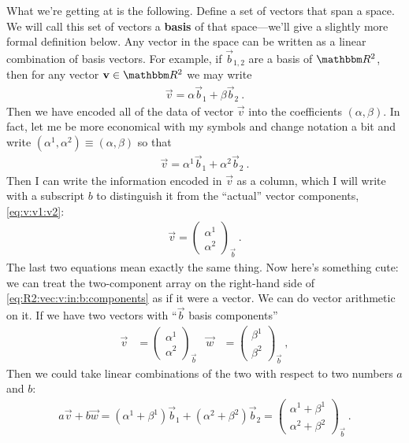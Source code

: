 \documentclass[12pt, oneside]{report}    %
\begin{document}
What we're getting at is the following.  Define a set of vectors that span a space. We will call this set of vectors a \textbf{basis} of that space---we'll give a slightly more formal definition below. Any vector in the space can be written as a linear combination of basis vectors. For example, if $\vec{b}_{1,2}$ are a basis of $\RR ^2$, then for any vector $\vec{v}\in\RR ^2$ we may write
\begin{align}
    \vec{v} = \alpha \vec{b}_{1} + \beta \vec{b}_2 \ .
\end{align}
Then we have encoded all of the data of vector $\vec{v}$ into the coefficients $(\alpha, \beta)$. In fact, let me be more economical with my symbols and change notation a bit and write $(\alpha^1, \alpha^2) \equiv (\alpha,\beta)$ so that
\begin{align}
    \vec{v} = \alpha^1 \vec{b}_{1} + \alpha^2 \vec{b}_2 \ .
    \label{eq:R2:vec:v:in:b:components:lincomb}
\end{align}
Then I can write the information encoded in $\vec{v}$ as a column, which I will write with a subscript $b$ to distinguish it from the ``actual'' vector components, \eqref{eq:v:v1:v2}:
\begin{align}
    \vec{v} = 
    \begin{pmatrix}
        \alpha^1\\
        \alpha^2
    \end{pmatrix}_{\vec{b}} \ .
    \label{eq:R2:vec:v:in:b:components}
\end{align}
The last two equations mean exactly the same thing. Now here's something cute: we can treat the two-component array on the right-hand side of \eqref{eq:R2:vec:v:in:b:components} as if it were a vector. We can do vector arithmetic on it. If we have two vectors with ``$\vec{b}$ basis components''
\begin{align}
    \vec{v}&=
    \begin{pmatrix}
        \alpha^1\\
        \alpha^2
    \end{pmatrix}_{\vec{b}} 
    &
    \vec{w}&=
    \begin{pmatrix}
        \beta^1\\
        \beta^2
    \end{pmatrix}_{\vec{b}}  \ ,
\end{align}
Then we could take linear combinations of the two with respect to two numbers $a$ and $b$:
\begin{align}
    a\vec{v} + b\vec{w} =
    (\alpha^1+\beta^1) \vec{b}_{1} + (\alpha^2+\beta^2) \vec{b}_2
    =
    \begin{pmatrix}
        \alpha^1 + \beta^1 \\
        \alpha^2 + \beta^2
    \end{pmatrix}_{\vec{b}} \ .
    \label{eq:linear:combination:in:b:basis}
\end{align}
\end{document}
